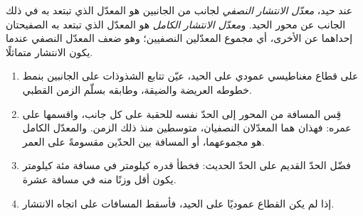 \begin{omfigure}
\par{}
\label{fig:b1:plate-kinematics:stripes}
\end{omfigure}

\begin{definition}\label{def:b1:plate-kinematics:spreading-rate}
عند حيد، \emph{معدّل الانتشار النصفي} لجانب من الجانبين هو المعدّل الذي تبتعد به  في ذلك الجانب عن محور الحيد. و\emph{معدّل الانتشار الكامل} هو المعدّل الذي تبتعد به الصفيحتان إحداهما عن الأخرى، أي مجموع المعدّلين النصفيين؛ وهو ضعف المعدّل النصفي عندما يكون الانتشار متماثلًا.
\end{definition}

\begin{method}\label{met:b1:plate-kinematics:rate}
\begin{enumerate}
  \item على قطاع مغناطيسي عمودي على الحيد، عيّن تتابع الشذوذات على الجانبين بنمط خطوطه العريضة والضيقة، وطابقه بسلّم الزمن القطبي.
  \item قِس المسافة من المحور إلى الحدّ نفسه للحقبة على كل جانب، واقسمها على عمره: فهذان هما المعدّلان النصفيان، متوسطين منذ ذلك الزمن. والمعدّل الكامل هو مجموعهما، أو المسافة بين الحدّين مقسومةً على العمر.
  \item فضّل الحدّ القديم على الحدّ الحديث: فخطأ قدره كيلومتر في مسافة مئة كيلومتر يكون أقل وزنًا منه في مسافة عشرة.
  \item إذا لم يكن القطاع عموديًا على الحيد، فأسقط المسافات على اتجاه الانتشار.
\end{enumerate}
\end{method}

